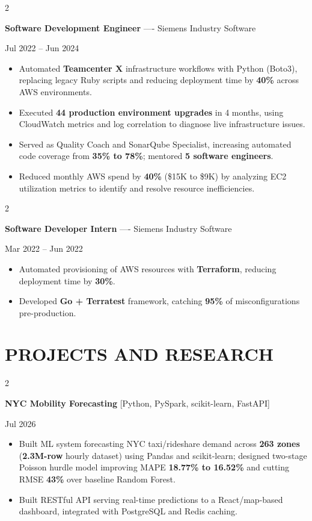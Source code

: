 \documentclass[10pt, letterpaper]{article}
\newenvironment{highlights}{
    \begin{itemize}[
        topsep=0.10 cm,
        parsep=0.06 cm,
        partopsep=0pt,
        itemsep=0.06 cm,
        leftmargin=12pt
    ]
}{
    \end{itemize}
}
\newenvironment{twocolentry}[2][]{
    \onecolentry
    \def\secondColumn{#2}
    \setcolumnwidth{\fill, 4.5 cm}
    \begin{paracol}{2}
}{
    \switchcolumn \raggedleft \secondColumn
    \end{paracol}
    \endonecolentry
}
\begin{document}
\vspace{0.15 cm}

\begin{twocolentry}{Jul 2022 -- Jun 2024}
\textbf{Software Development Engineer} ---- Siemens Industry Software
\end{twocolentry}
\begin{highlights}
  \item Automated \textbf{Teamcenter X} infrastructure workflows with Python (Boto3), replacing legacy Ruby scripts and reducing deployment time by \textbf{40\%} across AWS environments.
  \item Executed \textbf{44 production environment upgrades} in 4 months, using CloudWatch metrics and log correlation to diagnose live infrastructure issues.
  \item Served as Quality Coach and SonarQube Specialist, increasing automated code coverage from \textbf{35\% to 78\%}; mentored \textbf{5 software engineers}.
  \item Reduced monthly AWS spend by \textbf{40\%} (\$15K to \$9K) by analyzing EC2 utilization metrics to identify and resolve resource inefficiencies.
\end{highlights}

\vspace{0.15 cm}

\begin{twocolentry}{Mar 2022 -- Jun 2022}
\textbf{Software Developer Intern} ---- Siemens Industry Software
\end{twocolentry}
\begin{highlights}
  \item Automated provisioning of AWS resources with \textbf{Terraform}, reducing deployment time by \textbf{30\%}.
  \item Developed \textbf{Go + Terratest} framework, catching \textbf{95\%} of misconfigurations pre-production.
\end{highlights}

\section{PROJECTS AND RESEARCH}
\begin{twocolentry}{Jul 2026}
\textbf{NYC Mobility Forecasting} [Python, PySpark, scikit-learn, FastAPI]
\end{twocolentry}
\begin{highlights}
  \item Built ML system forecasting NYC taxi/rideshare demand across \textbf{263 zones} (\textbf{2.3M-row} hourly dataset) using Pandas and scikit-learn; designed two-stage Poisson hurdle model improving MAPE \textbf{18.77\% to 16.52\%} and cutting RMSE \textbf{43\%} over baseline Random Forest.
  \item Built RESTful API serving real-time predictions to a React/map-based dashboard, integrated with PostgreSQL and Redis caching.
\end{highlights}
\end{document}
